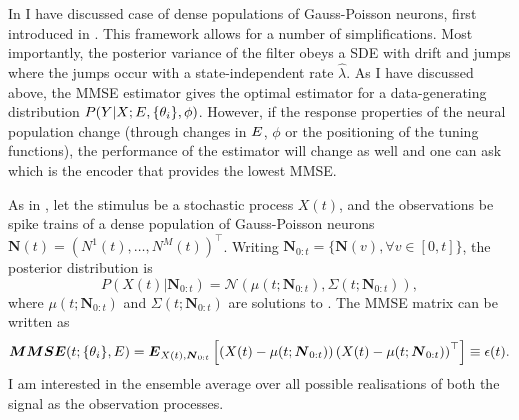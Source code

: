 In  I have discussed case of dense populations of Gauss-Poisson neurons, first introduced in . 
This framework allows for a number of simplifications. Most importantly, the posterior variance of the filter obeys a SDE with drift and jumps where the jumps occur with
a state-independent rate $\hat{\lambda}$. As I have discussed above, the MMSE estimator gives the optimal estimator for a data-generating distribution $P(Y|X;E,\{\theta_i\},\phi)$. 
However, if the response properties of the neural population change (through changes in $E$, $\phi$ or the positioning of the tuning functions), the performance of the estimator
will change as well and one can ask which is the encoder that provides the lowest MMSE.
\par

As in , let the stimulus be a stochastic process $X(t)$, and the observations be spike trains of a dense population of Gauss-Poisson neurons
$\boldsymbol{N}(t) = (N^1(t),\ldots, N^M(t))^\top$. Writing $\boldsymbol{N}_{0:t} = \{\boldsymbol{N}(v), \forall v \in [0,t]\}$, the posterior distribution is
\[
P(X(t)|\boldsymbol{N}_{0:t}) = \mathcal{N} \left(\mu(t;\boldsymbol{N}_{0:t}),\Sigma(t;\boldsymbol{N}_{0:t})\right),
\]
where $\mu(t;\boldsymbol{N}_{0:t})$ and $\Sigma(t;\boldsymbol{N}_{0:t})$ are solutions to .
The MMSE matrix can be written as
\[
\boldsymbol{MMSE}(t;\{\theta_i\},E) = \boldsymbol{E}_{X(t),\boldsymbol{N}_{0:t}}\left[\left(X(t) -\mu(t;\boldsymbol{N}_{0:t})\right)\left(X(t) - \mu(t;\boldsymbol{N}_{0:t})\right)^\top\right]\equiv \epsilon(t).
\]
I am interested in the ensemble average over all possible realisations of both the signal as the observation processes.\par

